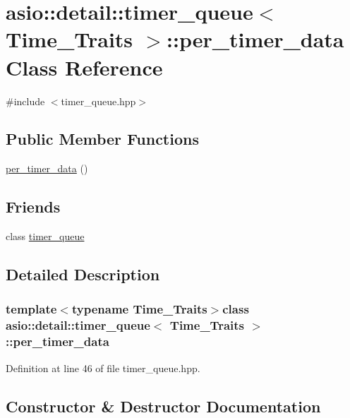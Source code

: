 \hypertarget{classasio_1_1detail_1_1timer__queue_1_1per__timer__data}{}\section{asio\+:\+:detail\+:\+:timer\+\_\+queue$<$ Time\+\_\+\+Traits $>$\+:\+:per\+\_\+timer\+\_\+data Class Reference}
\label{classasio_1_1detail_1_1timer__queue_1_1per__timer__data}


{\ttfamily \#include $<$timer\+\_\+queue.\+hpp$>$}

\subsection*{Public Member Functions}
\begin{DoxyCompactItemize}
\item 
\hyperlink{classasio_1_1detail_1_1timer__queue_1_1per__timer__data_a7481de4d86d55604f5c642d0fcfff383}{per\+\_\+timer\+\_\+data} ()
\end{DoxyCompactItemize}
\subsection*{Friends}
\begin{DoxyCompactItemize}
\item 
class \hyperlink{classasio_1_1detail_1_1timer__queue_1_1per__timer__data_af902b930ce23b4575f973bda3beefedc}{timer\+\_\+queue}
\end{DoxyCompactItemize}


\subsection{Detailed Description}
\subsubsection*{template$<$typename Time\+\_\+\+Traits$>$class asio\+::detail\+::timer\+\_\+queue$<$ Time\+\_\+\+Traits $>$\+::per\+\_\+timer\+\_\+data}



Definition at line 46 of file timer\+\_\+queue.\+hpp.



\subsection{Constructor \& Destructor Documentation}
\hypertarget{classasio_1_1detail_1_1timer__queue_1_1per__timer__data_a7481de4d86d55604f5c642d0fcfff383}{}
